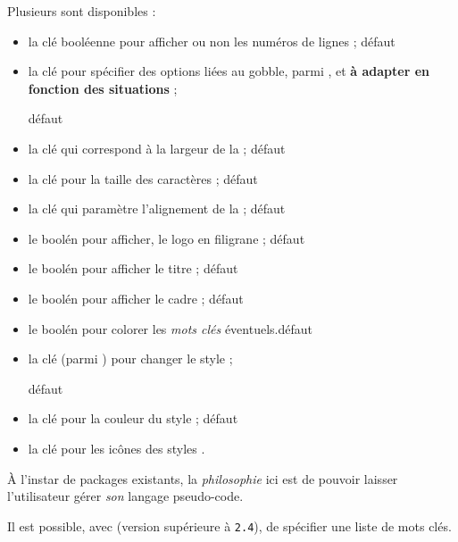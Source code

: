 \begin{cautionblock}
Plusieurs  sont disponibles :

\begin{itemize}
	\item la clé booléenne  pour afficher ou non les numéros de lignes ; \hfill{}défaut 
	\item {} la clé  pour spécifier des options liées au \textsf{gobble}, parmi , et \textbf{à adapter en fonction des situations} ;
	
	\hfill{}défaut 
	\item la clé  qui correspond à la largeur de la  ; \hfill{}défaut 
	\item la clé  pour la taille des caractères ; \hfill{}défaut 
	\item la clé  qui paramètre l'alignement de la  ;  \hfill{}défaut 
	\item le boolén  pour afficher, le logo {\small \faPython} en filigrane ; \hfill{}défaut 
	\item le boolén  pour afficher le titre ; \hfill{}défaut 
	\item le boolén  pour afficher le cadre ; \hfill{}défaut 
	\item le boolén  pour colorer les \textit{mots clés} éventuels.\hfill{}défaut 
	\item {} la clé  (parmi ) pour changer le style ;
	
	\hfill{}défaut 
	\item {} la clé  pour la couleur du style  ; \hfill{}défaut 
	\item {} la clé  pour les icônes des styles .
\end{itemize}
\vspace*{-\baselineskip}\leavevmode
\end{cautionblock}

\begin{warningblock}
À l'instar de packages existants, la \textit{philosophie} ici est de pouvoir laisser l'utilisateur gérer \textit{son} langage pseudo-code.

\smallskip

 Il est possible, avec  (version supérieure à \texttt{2.4}), de spécifier une liste de mots clés.
\end{warningblock}

